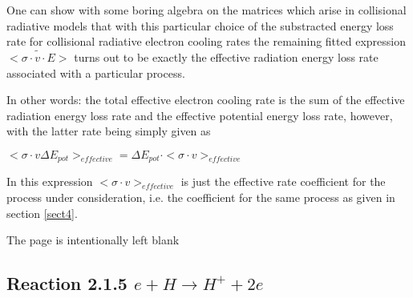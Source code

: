 \documentclass[12pt]{article}
\begin{document}
One can show with some boring algebra on the matrices which arise in collisional radiative
models that
with this particular choice of the substracted energy loss rate for collisional radiative
electron cooling rates 
the remaining fitted expression $\tilde{<\sigma \cdot v \cdot E>}$
turns out to be exactly the effective radiation energy loss rate
associated with a particular process.

In other words: the total effective electron cooling rate 
is the sum of the effective 
radiation energy loss rate
and the effective potential energy loss rate, however, with the latter rate being simply
given as

$<\sigma \cdot v \Delta E_{pot}>_{effective} = \Delta E_{pot} 
\cdot <\sigma \cdot v>_{effective}$

In this expression $<\sigma \cdot v>_{effective}$ is just the effective rate coefficient
for the process under consideration, i.e. the coefficient for the same process as given
in section \ref{sect4}.

\newpage
The page is intentionally left blank
\newpage

\subsection{
Reaction 2.1.5  $ e + H \rightarrow H^+ + 2e $
}
\end{document}
